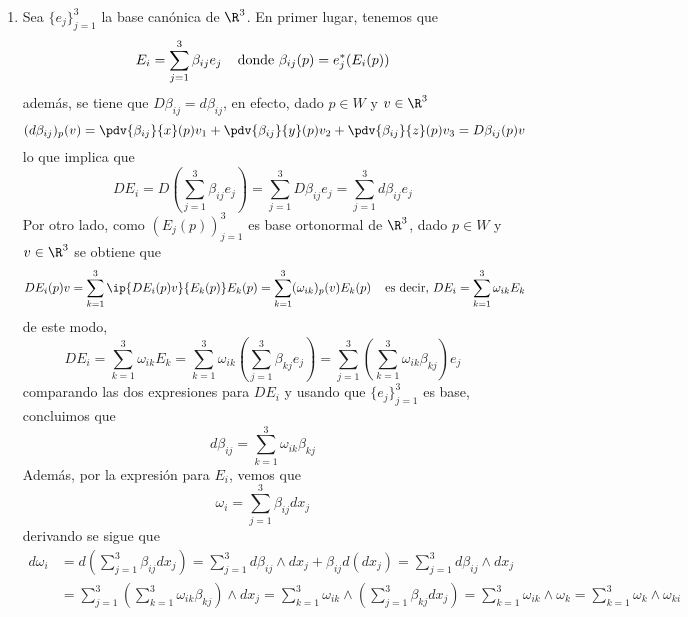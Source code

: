 \documentclass{article}
\begin{document}
\begin{enumerate}
    \item Sea $\{e_{j}\}_{j=1}^{3}$ la base canónica de $\R^{3}$. En primer lugar, tenemos que
    \begin{equation*}
        E_{i}=\sum_{j=1}^{3}\beta_{ij}e_{j}
        \hspace{4mm}\text{donde }\beta_{ij}(p)=e_{j}^{*}(E_{i}(p))
    \end{equation*}
    además, se tiene que $D\beta_{ij}=d\beta_{ij}$, en efecto, dado $p\in W$ y $v\in\R^{3}$
    \begin{equation*}
        (d\beta_{ij})_{p}(v)=\pdv{\beta_{ij}}{x}(p)v_{1}+\pdv{\beta_{ij}}{y}(p)v_{2}
        +\pdv{\beta_{ij}}{z}(p)v_{3}=D\beta_{ij}(p)v
    \end{equation*}
    lo que implica que
    \begin{equation*}
        DE_{i}=D\left(\sum_{j=1}^{3}\beta_{ij}e_{j}\right)=\sum_{j=1}^{3}D\beta_{ij}e_{j}
        =\sum_{j=1}^{3}d\beta_{ij}e_{j}
    \end{equation*}
    Por otro lado, como $(E_{j}(p))_{j=1}^{3}$ es base ortonormal de $\R^{3}$, dado $p\in W$ y 
    $v\in\R^{3}$ se obtiene que
    \begin{equation*}
        DE_{i}(p)v=\sum_{k=1}^{3}\ip{DE_{i}(p)v}{E_{k}(p)}E_{k}(p)
        =\sum_{k=1}^{3}(\omega_{ik})_{p}(v)E_{k}(p)
        \hspace{4mm}\text{es decir, }DE_{i}=\sum_{k=1}^{3}\omega_{ik}E_{k}
    \end{equation*}
    de este modo,
    \begin{equation*}
        DE_{i}=\sum_{k=1}^{3}\omega_{ik}E_{k}
        =\sum_{k=1}^{3}\omega_{ik}\left(\sum_{j=1}^{3}\beta_{kj}e_{j}\right)
        =\sum_{j=1}^{3}\left(\sum_{k=1}^{3}\omega_{ik}\beta_{kj}\right)e_{j}
    \end{equation*}
    comparando las dos expresiones para $DE_{i}$ y usando que $\{e_{j}\}_{j=1}^{3}$ es base, 
    concluimos que
    \begin{equation*}
        d\beta_{ij}=\sum_{k=1}^{3}\omega_{ik}\beta_{kj}
    \end{equation*}
    Además, por la expresión para $E_{i}$, vemos que
    \begin{equation*}
        \omega_{i}=\sum_{j=1}^{3}\beta_{ij}dx_{j}
    \end{equation*}
    derivando se sigue que
    \begin{align*}
        d\omega_{i} &= d\left(\sum_{j=1}^{3}\beta_{ij}dx_{j}\right)
        =\sum_{j=1}^{3}d\beta_{ij}\land dx_{j}+\beta_{ij}d(dx_{j})
        =\sum_{j=1}^{3}d\beta_{ij}\land dx_{j} \\[2mm]
        &= \sum_{j=1}^{3}\left(\sum_{k=1}^{3}\omega_{ik}\beta_{kj}\right)\land dx_{j}
        =\sum_{k=1}^{3}\omega_{ik}\land\left(\sum_{j=1}^{3}\beta_{kj}dx_{j}\right)
        =\sum_{k=1}^{3}\omega_{ik}\land\omega_{k}=\sum_{k=1}^{3}\omega_{k}\land\omega_{ki}
    \end{align*}


\end{enumerate}
\end{document}
